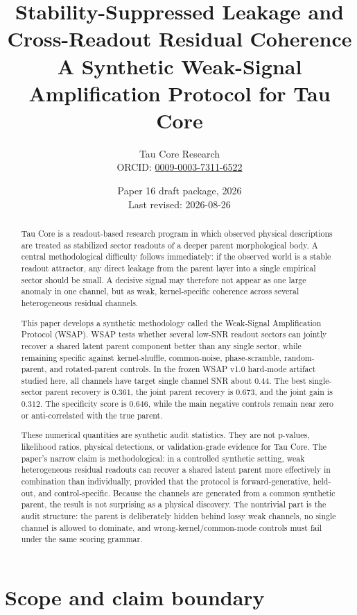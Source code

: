 \documentclass[12pt]{article}
\title{\textbf{Stability-Suppressed Leakage and Cross-Readout Residual Coherence}\\
\large A Synthetic Weak-Signal Amplification Protocol for Tau Core}
\author{Tau Core Research\\{\small ORCID: \href{https://orcid.org/0009-0003-7311-6522}{0009-0003-7311-6522}}}
\date{Paper 16 draft package, 2026\\Last revised: 2026-08-26}
\begin{document}
\maketitle

\begin{abstract}
Tau Core is a readout-based research program in which observed physical
descriptions are treated as stabilized sector readouts of a deeper parent
morphological body.  A central methodological difficulty follows immediately:
if the observed world is a stable readout attractor, any direct leakage from the
parent layer into a single empirical sector should be small.  A decisive signal
may therefore not appear as one large anomaly in one channel, but as weak,
kernel-specific coherence across several heterogeneous residual channels.

This paper develops a synthetic methodology called the Weak-Signal
Amplification Protocol (WSAP).  WSAP tests whether several low-SNR readout
sectors can jointly recover a shared latent parent component better than any
single sector, while remaining specific against kernel-shuffle, common-noise,
phase-scramble, random-parent, and rotated-parent controls.  In the frozen
WSAP v1.0 hard-mode artifact studied here, all channels have target single
channel SNR about \(0.44\).  The best single-sector parent recovery is
\(0.361\), the joint parent recovery is \(0.673\), and the joint gain is
\(0.312\).  The specificity score is \(0.646\), while the main negative
controls remain near zero or anti-correlated with the true parent.

These numerical quantities are synthetic audit statistics.  They are not
p-values, likelihood ratios, physical detections, or validation-grade evidence
for Tau Core.  The paper's narrow claim is methodological: in a controlled
synthetic setting, weak heterogeneous residual readouts can recover a shared
latent parent more effectively in combination than individually, provided that
the protocol is forward-generative, held-out, and control-specific.
Because the channels are generated from a common synthetic parent, the result is
not surprising as a physical discovery.  The nontrivial part is the audit
structure: the parent is deliberately hidden behind lossy weak channels, no
single channel is allowed to dominate, and wrong-kernel/common-mode controls
must fail under the same scoring grammar.
\end{abstract}

\section{Scope and claim boundary}
\end{document}
